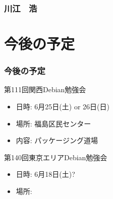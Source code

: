 \documentclass[cjk,dvipdfmx,10pt,compress,%
hyperref={bookmarks=true,bookmarksnumbered=true,bookmarksopen=false,%
colorlinks=false,%
pdftitle={第 109 回 関西 Debian 勉強会},%
pdfauthor={倉敷・のがた・佐々木・かわだ},%
pdfsubject={資料},%
}]{beamer}
\begin{document}
\begin{frame}
  \frametitle{ 川江　浩 }
\end{frame}




\section{今後の予定}
\begin{frame}[fragile]
  \frametitle{今後の予定}

  \begin{block}{第111回関西Debian勉強会}
    \begin{itemize}
    \item 日時: 6月25日(土) or 26日(日)
    \item 場所: 福島区民センター
    \item 内容: パッケージング道場
    \end{itemize}
  \end{block}

  \begin{block}{第140回東京エリアDebian勉強会}
    \begin{itemize}
    \item 日時: 6月18日(土)?
    \item 場所:
    \end{itemize}
  \end{block}

\end{frame}

\takahashi[50]{  }
\end{document}
